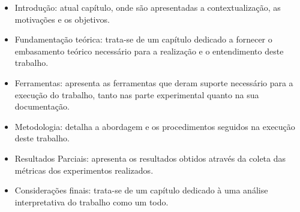 \begin{itemize}
\item Introdução: atual capítulo, onde são apresentadas a contextualização, as motivações e os objetivos. 
\item Fundamentação teórica: trata-se de um capítulo dedicado a fornecer o embasamento teórico necessário para a realização e o entendimento deste trabalho.
\item Ferramentas: apresenta as ferramentas que deram suporte necessário para a execução do trabalho, tanto nas parte experimental quanto na sua documentação.
\item Metodologia: detalha a abordagem e os procedimentos seguidos na execução deste trabalho.
\item Resultados Parciais: apresenta os resultados obtidos através da coleta das métricas dos experimentos realizados.
\item Considerações finais: trata-se de um capítulo dedicado à uma análise interpretativa do trabalho como um todo.
\end{itemize}
